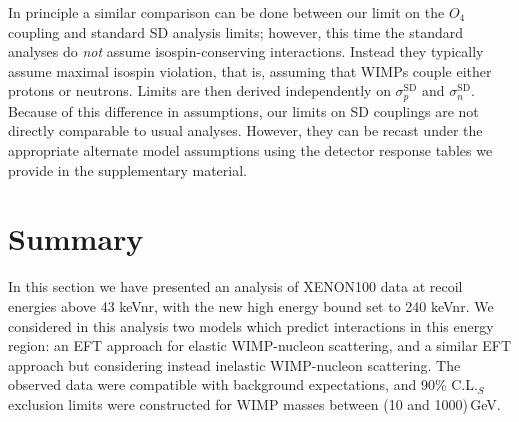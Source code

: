 In principle a similar comparison can be done between our limit on the $O_4$ coupling and standard SD analysis limits; however, this time the standard analyses do {\em not} assume isospin-conserving interactions. Instead they typically assume maximal isospin violation, that is, assuming that WIMPs couple either protons or neutrons. Limits are then derived independently on $\sigma_{p}^\mathrm{SD}$ and $\sigma_{n}^\mathrm{SD}$. Because of this difference in assumptions, our limits on SD couplings are not directly comparable to usual analyses. However, they can be recast under the appropriate alternate model assumptions using the detector response tables we provide in the supplementary material.

\section{Summary}
In this section we have presented an analysis of XENON100 data at
recoil energies above 43 keVnr, with the new high energy
bound set to 240 keVnr. We considered in this analysis two
models which predict interactions in this energy region:
an EFT approach for elastic WIMP-nucleon scattering,
and a similar EFT approach but considering instead inelastic WIMP-nucleon scattering. The observed data were
compatible with background expectations, and 90\% C.L.$_S$
exclusion limits were constructed for WIMP masses between (10 and 1000)\,GeV.
%

